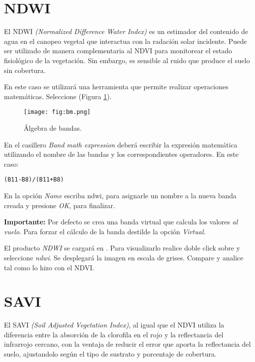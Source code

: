 \section{NDWI}

El NDWI \emph{(Normalized Difference Water Index)} es un estimador del contenido de agua en el canopeo vegetal que interactua con la radación solar incidente. Puede ser utilizado de manera complementaria al NDVI para monitorear el estado fisiológico de la vegetación. Sin embargo, es sensible al ruido que produce el suelo sin cobertura.


En este caso se utilizará una herramienta que permite realizar operaciones matemáticas. Seleccione  (Figura \ref{fig:bm}).

 \begin{figure}[h!]
     \centering
     \texttt{[image: fig:bm.png]}
     \caption{Álgebra de bandas.}
     \label{fig:bm}
 \end{figure}


En el casillero \emph{Band math expression} deberá escribir la expresión matemática utilizando el nombre de las bandas y los correspondientes operadores. En este caso:
 
\begin{center}
\texttt{(B11-B8)/(B11+B8)}
\end{center}
 
En la opción \emph{Name} escriba ndwi, para asignarle un nombre a la nueva banda creada y presione \emph{OK}, para finalizar.

 {\bf Importante:} Por defecto se crea una banda virtual que calcula los valores \emph{al vuelo}. Para forzar el cálculo de la banda destilde la opción \emph{Virtual}.

El producto \emph{NDWI} se cargará en . Para visualizarlo realice doble click sobre  y seleccione \emph{ndwi}. Se desplegará la imagen en escala de grises. Compare y analice tal como lo hizo con el NDVI.

\section{SAVI}

El SAVI \emph{(Soil Adjusted Vegetation Index)}, al igual que el NDVI utiliza la diferencia entre la absorción de la clorofila en el rojo y la reflectancia del infrarrojo cercano, con la ventaja de reducir el error que aporta la reflectancia del suelo, ajustandolo según el tipo de sustrato y porcentaje de cobertura.


